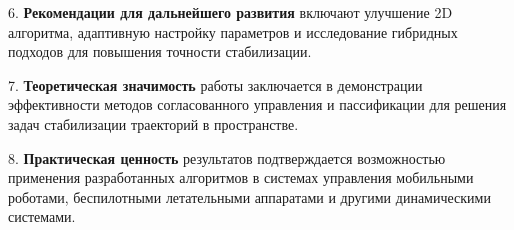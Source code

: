 6. \textbf{Рекомендации для дальнейшего развития} включают улучшение 2D алгоритма, адаптивную настройку параметров и исследование гибридных подходов для повышения точности стабилизации.

7. \textbf{Теоретическая значимость} работы заключается в демонстрации эффективности методов согласованного управления и пассификации для решения задач стабилизации траекторий в пространстве.

8. \textbf{Практическая ценность} результатов подтверждается возможностью применения разработанных алгоритмов в системах управления мобильными роботами, беспилотными летательными аппаратами и другими динамическими системами.

